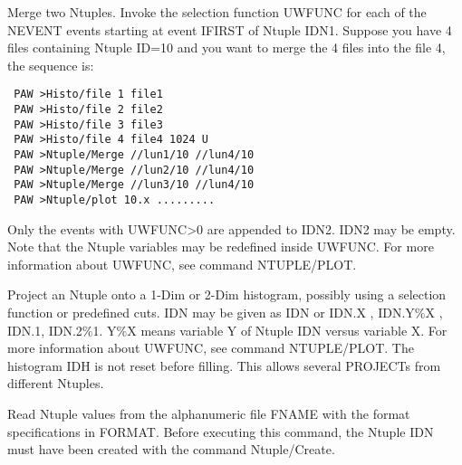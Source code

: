 \BEGARG
{}
\ENDARG
\BEGTEXT
Merge two Ntuples.
Invoke the selection function UWFUNC for each of the NEVENT events
starting at event IFIRST of Ntuple IDN1.
Suppose you have 4 files containing Ntuple ID=10 and you want to merge
the 4 files into the file 4, the sequence is:
\begin{verbatim}
 PAW >Histo/file 1 file1
 PAW >Histo/file 2 file2
 PAW >Histo/file 3 file3
 PAW >Histo/file 4 file4 1024 U
 PAW >Ntuple/Merge //lun1/10 //lun4/10
 PAW >Ntuple/Merge //lun2/10 //lun4/10
 PAW >Ntuple/Merge //lun3/10 //lun4/10
 PAW >Ntuple/plot 10.x .........
\end{verbatim}
Only the events with UWFUNC>0 are appended to IDN2. IDN2 may be empty.
Note that the Ntuple variables may be redefined inside UWFUNC.
For more information about UWFUNC, see command NTUPLE/PLOT.
\ENDTEXT

\BEGARG
{}
\ENDARG
\BEGTEXT
Project an Ntuple onto a 1-Dim or 2-Dim histogram,
possibly using a selection function or predefined cuts.
IDN may be given as IDN or IDN.X , IDN.Y\%X , IDN.1, IDN.2\%1.
Y\%X means variable Y of Ntuple IDN versus variable X.
For more information about UWFUNC, see command NTUPLE/PLOT.
The histogram IDH is not reset before filling. This allows
several PROJECTs from different Ntuples.
\ENDTEXT

\BEGARG
{}
\ENDARG
\BEGTEXT
Read Ntuple values from the alphanumeric file FNAME with
the format specifications in FORMAT.
Before executing this command, the Ntuple IDN must have been
created with the command Ntuple/Create.
\ENDTEXT

